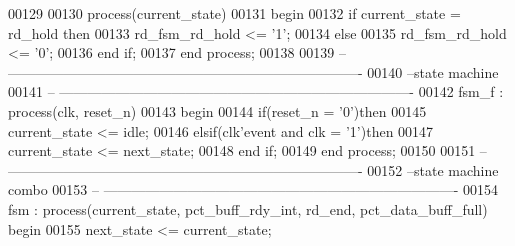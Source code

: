 \begin{DoxyCode}
00129 
00130 \textcolor{keywordflow}{process}(current_state)
00131 \textcolor{vhdlkeyword}{begin }
00132 \textcolor{keywordflow}{if} \textcolor{vhdlchar}{current_state} \textcolor{vhdlchar}{=} \textcolor{vhdlchar}{rd\_hold} \textcolor{keywordflow}{then} 
00133       \textcolor{vhdlchar}{rd_fsm_rd_hold} \textcolor{vhdlchar}{<=} \textcolor{vhdlchar}{'}\textcolor{vhdllogic}{}\textcolor{vhdllogic}{1}\textcolor{vhdlchar}{'};
00134    \textcolor{keywordflow}{else} 
00135       \textcolor{vhdlchar}{rd_fsm_rd_hold} \textcolor{vhdlchar}{<=} \textcolor{vhdlchar}{'}\textcolor{vhdllogic}{}\textcolor{vhdllogic}{0}\textcolor{vhdlchar}{'};
00136    \textcolor{keywordflow}{end} \textcolor{keywordflow}{if};
00137 \textcolor{keywordflow}{end} \textcolor{keywordflow}{process};
00138 
00139 \textcolor{keyword}{-- ----------------------------------------------------------------------------}
00140 \textcolor{keyword}{--state machine}
00141 \textcolor{keyword}{-- ----------------------------------------------------------------------------}
00142 fsm\_f : \textcolor{keywordflow}{process}(clk, reset_n)
00143 \textcolor{vhdlkeyword}{begin}
00144     \textcolor{keywordflow}{if}\textcolor{vhdlchar}{(}\textcolor{vhdlchar}{reset_n} \textcolor{vhdlchar}{=} \textcolor{vhdlchar}{'}\textcolor{vhdllogic}{}\textcolor{vhdllogic}{0}\textcolor{vhdlchar}{'}\textcolor{vhdlchar}{)}\textcolor{keywordflow}{then}
00145         \textcolor{vhdlchar}{current_state} \textcolor{vhdlchar}{<=} \textcolor{vhdlchar}{idle};
00146     \textcolor{keywordflow}{elsif}\textcolor{vhdlchar}{(}\textcolor{vhdlchar}{clk}\textcolor{vhdlchar}{'}\textcolor{vhdlkeyword}{event} \textcolor{keywordflow}{and} \textcolor{vhdlchar}{clk} \textcolor{vhdlchar}{=} \textcolor{vhdlchar}{'}\textcolor{vhdllogic}{}\textcolor{vhdllogic}{1}\textcolor{vhdlchar}{'}\textcolor{vhdlchar}{)}\textcolor{keywordflow}{then}
00147       \textcolor{vhdlchar}{current_state} \textcolor{vhdlchar}{<=} \textcolor{vhdlchar}{next_state};
00148     \textcolor{keywordflow}{end} \textcolor{keywordflow}{if}; 
00149 \textcolor{keywordflow}{end} \textcolor{keywordflow}{process};
00150 
00151 \textcolor{keyword}{-- ----------------------------------------------------------------------------}
00152 \textcolor{keyword}{--state machine combo}
00153 \textcolor{keyword}{-- ----------------------------------------------------------------------------}
00154 fsm : \textcolor{keywordflow}{process}(current_state, pct_buff_rdy_int, rd_end, pct_data_buff_full) \textcolor{keywordflow}{begin}
00155     \textcolor{vhdlchar}{next_state} \textcolor{vhdlchar}{<=} \textcolor{vhdlchar}{current_state};

\end{DoxyCode}
